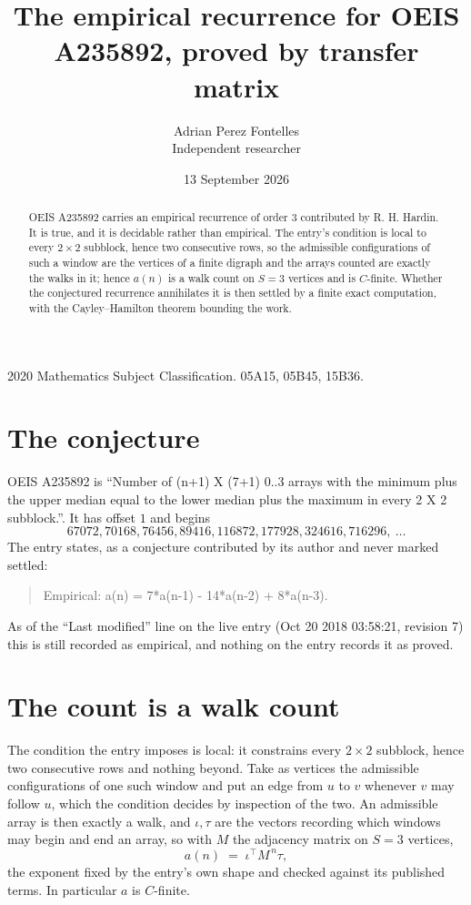 \documentclass[11pt,a4paper]{article}
\title{The empirical recurrence for OEIS A235892, proved by transfer matrix}
\author{Adrian Perez Fontelles\\ \small Independent researcher}
\date{13 September 2026}
\theoremstyle{plain}
\theoremstyle{definition}
\begin{document}
\maketitle

\begin{abstract}
OEIS A235892 carries an empirical recurrence of order $3$ contributed by R. H. Hardin. It is
true, and it is decidable rather than empirical. The entry's condition is local to every $2\times2$ subblock, hence two consecutive rows, so
the admissible configurations of such a window are the vertices of a finite digraph and the
arrays counted are exactly the walks in it; hence $a(n)$ is a walk count on $S=3$ vertices
and is $C$-finite. Whether the conjectured recurrence annihilates it is then settled by a
finite exact computation, with the Cayley--Hamilton theorem bounding the work.
\end{abstract}

\noindent\small 2020 Mathematics Subject Classification. 05A15, 05B45, 15B36.\normalsize

\section{The conjecture}

OEIS A235892 is ``Number of (n+1) X (7+1) 0..3 arrays with the minimum plus the upper median equal to the lower median plus the maximum in every 2 X 2 subblock.''. It has offset $1$ and begins
\[
67072, 70168, 76456, 89416, 116872, 177928, 324616, 716296,\ \dots
\]
The entry states, as a conjecture contributed by its author and never marked settled:
\begin{quote}
Empirical: a(n) = 7*a(n-1) - 14*a(n-2) + 8*a(n-3).
\end{quote}
As of the ``Last modified'' line on the live entry (Oct 20 2018 03:58:21, revision 7) this is still
recorded as empirical, and nothing on the entry records it as proved.

\section{The count is a walk count}

The condition the entry imposes is local: it constrains every $2\times2$ subblock, hence two consecutive rows and nothing beyond. Take as vertices the admissible configurations of one such window and put an edge from $u$ to $v$ whenever $v$ may follow $u$, which the condition decides by inspection of the two.
An admissible array is then exactly a walk, and $\iota,\tau$ are the vectors recording which windows may begin and end an array, so with $M$ the adjacency matrix on $S=3$ vertices,
\[
a(n)\;=\;\iota^{\!\top}M^{\,n}\tau ,
\]
the exponent fixed by the entry's own shape and checked against its published terms. In
particular $a$ is $C$-finite.
\end{document}
